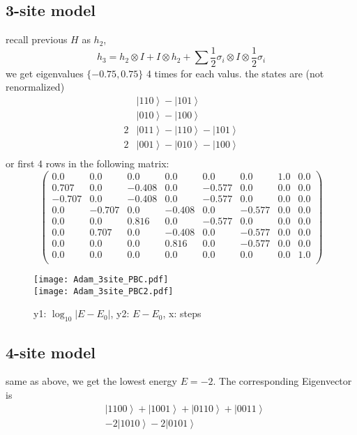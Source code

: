 \documentclass{article}
\newcommand{\ket}[1]{\left\lvert #1\right\rangle}
\begin{document}
\subsection*{3-site model}
recall previous $H$ as $h_2$,
\[
    h_3 = h_2\otimes I + I \otimes h_2 
        + \sum \frac12\sigma_i\otimes I\otimes \frac12\sigma_i
\]
we get eigenvalues $\{-0.75, 0.75\}$ 4 times for each valus.
the states are (not renormalized)
    \begin{align*}
        &\ket{110}-\ket{101}\\
        &\ket{010}-\ket{100}\\
        2&\ket{011}-\ket{110}-\ket{101}\\
        2&\ket{001}-\ket{010}-\ket{100}\\
    \end{align*}
or first 4 rows in the following matrix:
\[
    \begin{pmatrix}
        0.0 & 0.0 & 0.0 & 0.0 & 0.0 & 0.0 & 1.0 & 0.0\\
        0.707 & 0.0 & -0.408 & 0.0 & -0.577 & 0.0 & 0.0 & 0.0\\
        -0.707 & 0.0 & -0.408 & 0.0 & -0.577 & 0.0 & 0.0 & 0.0\\
        0.0 & -0.707 & 0.0 & -0.408 & 0.0 & -0.577 & 0.0 & 0.0\\
        0.0 & 0.0 & 0.816 & 0.0 & -0.577 & 0.0 & 0.0 & 0.0\\
        0.0 & 0.707 & 0.0 & -0.408 & 0.0 & -0.577 & 0.0 & 0.0\\
        0.0 & 0.0 & 0.0 & 0.816 & 0.0 & -0.577 & 0.0 & 0.0\\
        0.0 & 0.0 & 0.0 & 0.0 & 0.0 & 0.0 & 0.0 & 1.0\\     
    \end{pmatrix}
\]
\begin{figure}[!ht]
	\centering
    \texttt{[image: Adam\_3site\_PBC.pdf]}\\
    \texttt{[image: Adam\_3site\_PBC2.pdf]}
	\caption{y1: $\log_{10}\lvert E-E_0 \rvert$, y2: $E-E_0$, x: steps}
\end{figure}


\subsection*{4-site model}
same as above, we get the lowest energy $E=-2$. The corresponding Eigenvector
is
\begin{align*}
    &\ket{1100}+\ket{1001}+\ket{0110}+\ket{0011}\\
    &-2\ket{1010}-2\ket{0101}
\end{align*}
\end{document}
